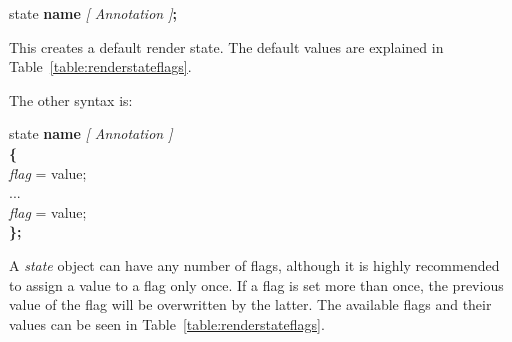 \documentclass{article}
\newcommand{\SyntaxBox}[1]
{	
	\begin{center}
	\colorbox{orange!60}
	{
		\begin{minipage}{\linewidth}
		\hfill
		\begin{tabbing}
		#1
		\end{tabbing}
		\end{minipage}
	}
	\end{center}
}
\begin{document}
\begin{center}
\SyntaxBox
{
	state \textbf{name} \textit{[ Annotation ]}\textbf{;}
}
\end{center}

This creates a default render state. The default values are explained in Table~\ref{table:renderstateflags}. 

The other syntax is:

\SyntaxBox
{
		state \textbf{name} \textit{[ Annotation ]} \\
		\textbf{\{} \= \\
			\> \textit{flag} = value; \\
			\> ... \\
			\> \textit{flag} = value; \\
		\textbf{\};}
}

A \textit{state} object can have any number of flags, although it is highly recommended to assign a value to a flag only once. If a flag is set more than once, the previous value of the flag will be overwritten by the latter. The available flags and their values can be seen in Table~\ref{table:renderstateflags}.
\end{document}
